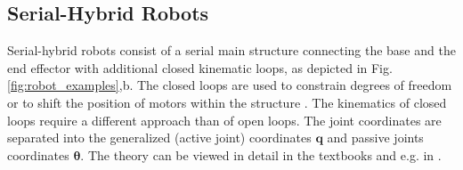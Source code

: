 \documentclass[runningheads]{llncs}
\begin{document}
\subsection{Serial-Hybrid Robots}
\label{sec:fundamentals_hybrid}


Serial-hybrid robots consist of a serial main structure connecting the base and the end effector with additional closed kinematic loops, as depicted in Fig.\,\ref{fig:robot_examples},b.
The closed loops are used to constrain degrees of freedom or to shift the position of motors within the structure \cite{NakamuraGho1989}.
The kinematics of closed loops require a different approach than of open loops.
The joint coordinates are separated into the generalized (active joint) coordinates $\bm{q}$ and passive joints coordinates $\bm{\theta}$.
The theory can be viewed in detail in the textbooks \cite{SaminFis2013,KhalilDom2002} and e.g. in \cite{NakamuraGho1989,KhalilCre1997,ShiMcP2000,FisettePosSasSam2002,Docquier2013}.

\end{document}
